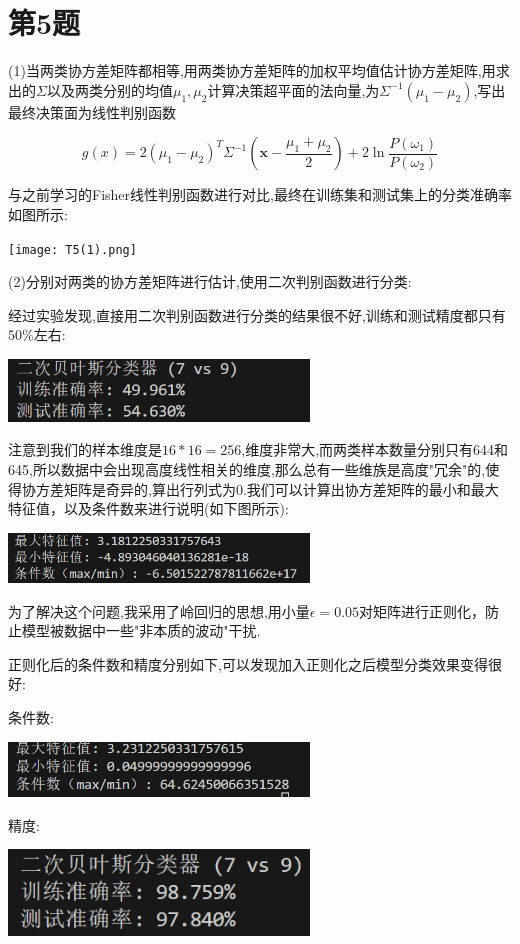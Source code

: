\documentclass{article}
\begin{document}
\section*{第5题}
(1)当两类协方差矩阵都相等,用两类协方差矩阵的加权平均值估计协方差矩阵,用求出的$\Sigma$以及两类分别的均值$\mu_1,\mu_2$计算决策超平面的法向量,为$\Sigma^{-1}(\mu_1-\mu_2)$,写出最终决策面为线性判别函数

\[g(x)=2(\mu_1-\mu_2)^T\Sigma^{-1}(\boldsymbol{x}-\frac{\mu_1+\mu_2}{2})+2\ln\frac{P(\omega_1)}{P(\omega_2)}\]

与之前学习的Fisher线性判别函数进行对比,最终在训练集和测试集上的分类准确率如图所示:

\noindent
\begin{center}
    \texttt{[image: T5(1).png]}
\end{center}

(2)分别对两类的协方差矩阵进行估计,使用二次判别函数进行分类:

经过实验发现,直接用二次判别函数进行分类的结果很不好,训练和测试精度都只有$50\%$左右:
\noindent 
\begin{center}
  \includegraphics[width=0.6\textwidth]{正则化前精度.png}
\end{center}

注意到我们的样本维度是$16*16=256$,维度非常大,而两类样本数量分别只有644和645,所以数据中会出现高度线性相关的维度,那么总有一些维族是高度"冗余"的,使得协方差矩阵是奇异的,算出行列式为0.我们可以计算出协方差矩阵的最小和最大特征值，以及条件数来进行说明(如下图所示):

\noindent
\begin{center}
    \includegraphics[width=0.6\textwidth]{正则化前条件数.png}
\end{center}

为了解决这个问题,我采用了岭回归的思想,用小量$\epsilon=0.05$对矩阵进行正则化，防止模型被数据中一些"非本质的波动"干扰.

正则化后的条件数和精度分别如下,可以发现加入正则化之后模型分类效果变得很好:

条件数:
\noindent
\begin{center}
    \includegraphics[width=0.6\textwidth]{正则化后条件数.png}
\end{center}
精度:
\noindent
\begin{center}
    \includegraphics[width=0.6\textwidth]{正则化后精度.png}
\end{center}
\end{document}
